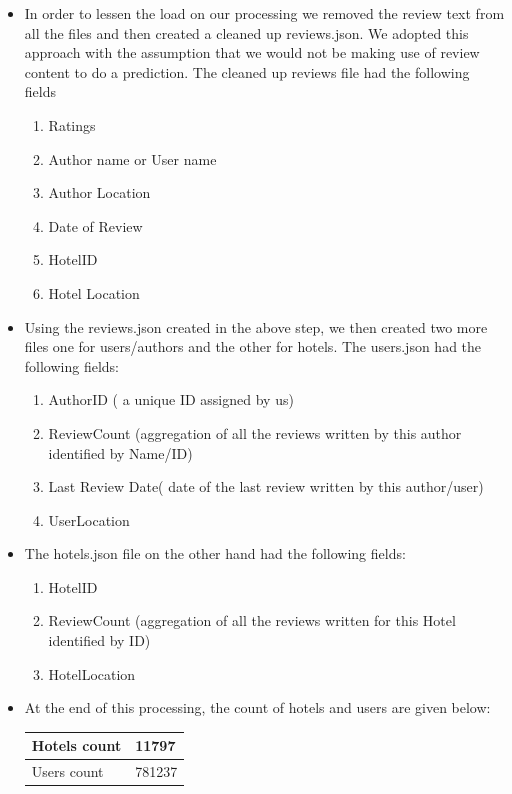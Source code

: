 \documentclass[letterpaper,twocolumn,11pt]{article}
\begin{document}
\begin{itemize}
\item In order to lessen the load on our processing we removed the review text from all the files and then created a cleaned up reviews.json. We adopted this approach with the assumption that we would not be making use of review content to do a prediction. The cleaned up reviews file had the following fields

\begin{enumerate}
\item Ratings
\item Author name or User name
\item Author Location
\item Date of Review
\item HotelID
\item Hotel Location
\end{enumerate}

\item Using the reviews.json created in the above step, we then created two more files one for users/authors and the other for hotels. The users.json had the following fields:
\begin{enumerate}
\item AuthorID ( a unique ID assigned by us)
\item ReviewCount (aggregation of all the reviews written by this author identified by Name/ID)
\item Last Review Date( date of the last review written by this author/user)
\item UserLocation
\end{enumerate}

\item The hotels.json file on the other hand had the following fields:
\begin{enumerate}
\item HotelID
\item ReviewCount (aggregation of all the reviews written for this Hotel identified by ID)
\item HotelLocation
\end{enumerate}

\item At the end of this processing, the count of hotels and users are given below:
\begin{table}[h]
	\centering
	\begin{tabular}{ |p{3cm}|p{3cm} |}
		\hline
		Hotels count	&	11797\\  \hline
		Users count  &	781237 \\  \hline
		

\end{tabular}
\end{table}
\end{itemize}
\end{document}
